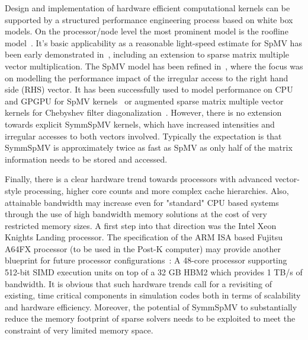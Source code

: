Design and implementation of hardware efficient computational kernels can be supported by a structured performance engineering process based on white box models. On the processor/node level the most prominent model is the roofline model~\cite{Williams_roofline}. It's basic applicability as a reasonable light-speed estimate for \acrshort{SpMV} has been early demonstrated in~\cite{Gropp:1999}, including an extension to sparse matrix multiple vector multiplication. The \acrshort{SpMV} model has been refined in~\cite{Moritz_sell}, where the focus was on modelling the performance impact of the irregular access to the  right hand side (RHS) vector. It has been successfully used to model performance on CPU and GPGPU for \acrshort{SpMV} kernels~\cite{Moritz_sell} or augmented sparse matrix multiple vector kernels for Chebyshev filter diagonalization~\cite{ISC2018:ChebFD}. However, there is no extension towards explicit \acrshort{SymmSpMV} kernels, which have increased intensities and irregular accesses to both vectors involved. Typically the expectation is that \acrshort{SymmSpMV} is approximately twice as fast as \acrshort{SpMV} as only half of the matrix information needs to be stored and accessed. 

Finally, there is a clear hardware trend towards processors with advanced vector-style processing, higher core counts and more complex cache hierarchies. Also, attainable bandwidth may increase even for "standard" CPU based systems through the use of high bandwidth memory solutions at the cost of very restricted memory sizes. A first step into that direction was the Intel Xeon Knights Landing processor. The specification of the ARM ISA based Fujitsu A64FX processor (to be used in the Post-K computer) may provide another blueprint for future processor configurations~\cite{Post-K:Processor}: A 48-core processor supporting 512-bit SIMD execution units on top of a  32 GB HBM2 which provides 1 TB/s of bandwidth.  It is obvious that such hardware trends call for a revisiting of existing, time critical components in simulation codes both in terms of scalability and hardware efficiency. Moreover, the potential of \acrshort{SymmSpMV} to substantially reduce the memory footprint of sparse solvers needs to be exploited to meet the constraint of very limited memory space. 

